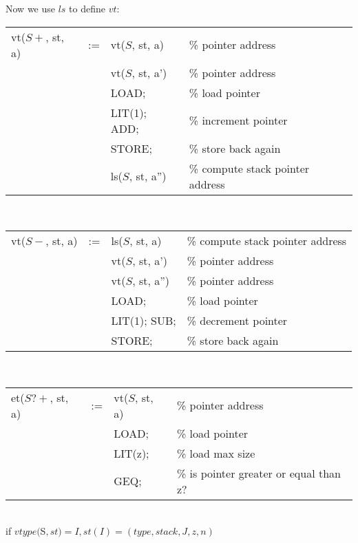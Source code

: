 \begin{solution}
\begin{enumerate}[(a)]
    Now we use $ls$ to define $vt$:\\
    \begin{tabular}{lcll}
        vt($S+$, st, a) & := & vt($S$, st, a)   & \% pointer address \\
                        &    & vt($S$, st, a')  & \% pointer address \\
                        &    & LOAD;            & \% load pointer \\
                        &    & LIT(1); ADD;     & \% increment pointer \\
                        &    & STORE;           & \% store back again \\
                        &    & ls($S$, st, a'') & \% compute stack pointer address \\
    \end{tabular}\\
    
    \begin{tabular}{lcll}
        vt($S-$, st, a) & := & ls($S$, st, a)   & \% compute stack pointer address \\
                        &    & vt($S$, st, a')  & \% pointer address \\
                        &    & vt($S$, st, a'') & \% pointer address \\
                        &    & LOAD;            & \% load pointer \\
                        &    & LIT(1); SUB;     & \% decrement pointer \\
                        &    & STORE;           & \% store back again \\
    \end{tabular}\\
    
    \begin{tabular}{lcll}
        et($S?+$, st, a) & := & vt($S$, st, a) & \% pointer address \\
                         &    & LOAD;          & \% load pointer \\
                         &    & LIT(z);        & \% load max size \\
                         &    & GEQ;           & \% is pointer greater or equal than z? \\
    \end{tabular}\\
    if $vtype($S$,st) = I, st(I) = (type,stack,J,z,n)$\\
    

\end{enumerate}
\end{solution}
